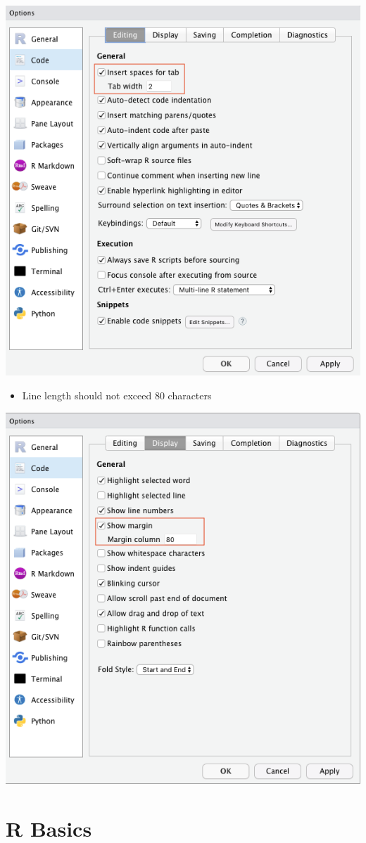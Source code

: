 \documentclass[
]{book}
\providecommand{\tightlist}{%
  \setlength{\itemsep}{0pt}\setlength{\parskip}{0pt}}
\begin{document}
\begin{center}\includegraphics[width=0.7\linewidth]{figures/indent_space} \end{center}

\begin{itemize}
\tightlist
\item
  Line length should not exceed 80 characters
\end{itemize}

\begin{center}\includegraphics[width=0.7\linewidth]{figures/line_length} \end{center}

\hypertarget{part-r-basics}{%
\part{R Basics}\label{part-r-basics}}
\end{document}
